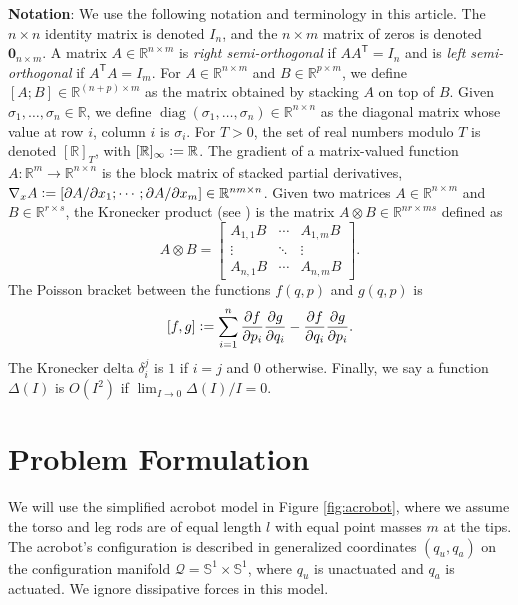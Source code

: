 \documentclass[journal,twoside,web, twocolumn,draftcls]{ieeecolor}
\DeclareMathOperator{\Diag}{diag}
\DeclareMathOperator{\interior}{int}
\newcommand*{\diag}[1]{\Diag\left(#1\right)}
\newcommand*{\tpose}{^\mathsf{T}}
\newcommand*{\Rt}[1]{[\R]_{#1}}
\newcommand*{\R}{\mathbb{R}}
\newcommand*{\Sone}{\mathbb{S}^1}
\newcommand*{\Id}[1]{I_{#1}}
\newcommand*{\Zmat}[1]{\bm{0}_{#1}}
\newcommand*{\pdiff}[2]{\frac{\partial #1}{\partial #2}}
\newcommand*{\eqdef}{\vcentcolon=}
\begin{document}
\textbf{Notation}:
We use the following notation and terminology in this article.
The \(n \times n\) identity matrix is denoted \(\Id{n}\), and the \(n \times m\)
matrix of zeros is denoted \(\Zmat{n\times m}\).
A matrix \(A \in \R^{n \times m}\) is \textit{right semi-orthogonal} if
\(A A\tpose = \Id{n}\) and is \textit{left semi-orthogonal} if 
\(A\tpose A = \Id{m}\).
For \(A \in \R^{n\times m}\) and \(B \in \R^{p \times m}\),
we define \([A;B] \in \R^{(n+p)\times m}\) as the matrix obtained by stacking \(A\)
on top of \(B\). 
Given \(\sigma_1,\ldots,\sigma_n \in \R\), we define 
\(\diag{\sigma_1,\ldots,\sigma_n} \in \R^{n \times n}\) as the diagonal matrix
whose value at row \(i\), column \(i\) is \(\sigma_i\).
For \(T > 0\), the set of real numbers modulo \(T\) is denoted \(\Rt{T}\), with
\(\Rt{\infty} \eqdef \R\). %
The gradient of a matrix-valued function 
\(A : \R^m \rightarrow \R^{n\times n}\) is the block matrix of stacked partial
derivatives, 
\(\nabla_xA \eqdef [\partial A/\partial x_1; \cdots; \partial A/\partial x_m] \in
\R^{nm \times n}\).
Given two matrices \(A \in \R^{n \times m}\) and \(B \in \R^{r \times s}\), the
Kronecker product (see \cite{kronprod}) is the matrix  
\(A \otimes B \in \R^{nr \times ms}\)  defined as
\begin{equation}\label{eqn:kronprod}
    A \otimes B = \begin{bmatrix}
        A_{1,1}B & \cdots & A_{1,m} B \\
        \vdots & \ddots & \vdots \\
        A_{n,1} B & \cdots & A_{n,m} B
    \end{bmatrix} 
    .
\end{equation}
The Poisson bracket \cite{landau_mechanics} between the functions
\(f(q,p)\) and \(g(q,p)\) is
\begin{equation}\label{eqn:poisson-bracket}
    [f,g] \eqdef \sum \limits_{i=1}^n \pdiff{f}{p_i}\pdiff{g}{q_i} - 
        \pdiff{f}{q_i}\pdiff{g}{p_i}
    .
\end{equation}
The Kronecker delta \(\delta_i^j\) is \(1\) if \(i = j\) and \(0\)
otherwise.
Finally, we say a function \(\Delta(I)\) is \(O(I^2)\)
if \(\lim_{I \to 0} \Delta(I)/I = 0\).

\section{Problem Formulation}\label{sec:problem-formulation}
We will use the simplified acrobot model in Figure
\ref{fig:acrobot}, where we assume the torso and leg rods are of
equal length \(l\) with equal point masses \(m\) at the tips.
The acrobot's configuration is described in generalized coordinates
\((q_u,q_a)\) on the configuration manifold 
\(\mathcal{Q} = \Sone \times \Sone\), where \(q_u\) is unactuated and 
\(q_a\) is actuated.
We ignore dissipative forces in this model.
\end{document}
